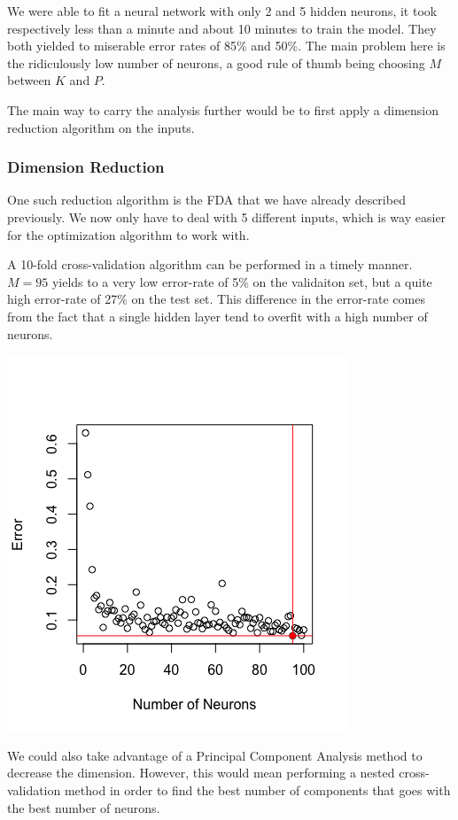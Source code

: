 \documentclass[]{report}
\begin{document}
 We were able to fit a neural network with only 2 and 5 hidden neurons, it took respectively less than a minute and about 10 minutes to train the model. They both yielded to miserable error rates of 85\% and 50\%. The main problem here is the ridiculously low number of neurons, a good rule of thumb being choosing $M$ between $K$ and $P$.
 
The main way to carry the analysis further would be to first apply a dimension reduction algorithm on the inputs.

\subsubsection{Dimension Reduction}
One such reduction algorithm is the FDA that we have already described previously. We now only have to deal with 5 different inputs, which is way easier for the optimization algorithm to work with. 

A 10-fold cross-validation algorithm can be performed in a timely manner. $M = 95$ yields to a very low error-rate of 5\% on the validaiton set, but a quite high error-rate of 27\% on the test set. This difference in the error-rate comes from the fact that a single hidden layer tend to overfit with a high number of neurons.

\begin{center}
	\includegraphics[width=0.6\linewidth]{Figures/nnet_fda_cv.png}
	\label{fig:nnet_fda_cv}
\end{center}

We could also take advantage of a Principal Component Analysis method to decrease the dimension. However, this would mean performing a nested cross-validation method in order to find the best number of components that goes with the best number of neurons.
\end{document}
